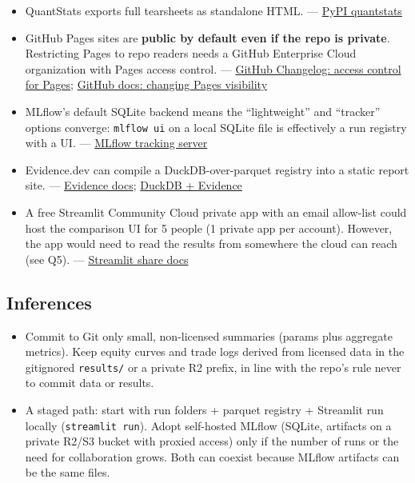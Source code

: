\documentclass{article}
\begin{document}
\begin{itemize}

\item QuantStats exports full tearsheets as standalone HTML. --- \href{https://pypi.org/project/quantstats/}{PyPI quantstats}

\item GitHub Pages sites are \textbf{public by default even if the repo is private}. Restricting Pages to repo readers needs a GitHub Enterprise Cloud organization with Pages access control. --- \href{https://github.blog/changelog/2021-01-21-access-control-for-github-pages/}{GitHub Changelog: access control for Pages}; \href{https://docs.github.com/en/enterprise-cloud@latest/pages/getting-started-with-github-pages/changing-the-visibility-of-your-github-pages-site}{GitHub docs: changing Pages visibility}

\item MLflow's default SQLite backend means the ``lightweight'' and ``tracker'' options converge: \texttt{mlflow ui} on a local SQLite file is effectively a run registry with a UI. --- \href{https://mlflow.org/docs/latest/self-hosting/architecture/tracking-server/}{MLflow tracking server}

\item Evidence.dev can compile a DuckDB-over-parquet registry into a static report site. --- \href{https://docs.evidence.dev/}{Evidence docs}; \href{https://duckdblab.org/en/post/duckdb-evidence-bi-dashboard/}{DuckDB + Evidence}

\item A free Streamlit Community Cloud private app with an email allow-list could host the comparison UI for 5 people (1 private app per account). However, the app would need to read the results from somewhere the cloud can reach (see Q5). --- \href{https://docs.streamlit.io/deploy/streamlit-community-cloud/share-your-app}{Streamlit share docs}

\end{itemize}

\subsection{Inferences}

\begin{itemize}

\item Commit to Git only small, non-licensed summaries (params plus aggregate metrics). Keep equity curves and trade logs derived from licensed data in the gitignored \texttt{results/\allowbreak{}} or a private R2 prefix, in line with the repo's rule never to commit data or results.

\item A staged path: start with run folders + parquet registry + Streamlit run locally (\texttt{streamlit run}). Adopt self-hosted MLflow (SQLite, artifacts on a private R2/\allowbreak{}S3 bucket with proxied access) only if the number of runs or the need for collaboration grows. Both can coexist because MLflow artifacts can be the same files.

\end{itemize}
\end{document}
